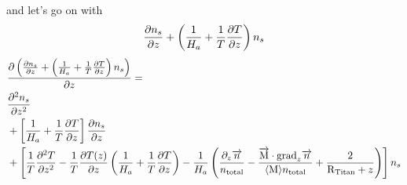 and let's go on with
\[
\frac{\partial n_s}{\partial z} + \left(\frac{1}{H_a} + \frac{1}{T}\frac{\partial T}{\partial z}\right)n_s
\]
\begin{equation}
\begin{split}
& \frac{\partial\left(\frac{\partial n_s}{\partial z} + \left(\frac{1}{H_a} + \frac{1}{T}\frac{\partial T}{\partial z}\right)n_s\right)}{\partial z} = \\
& \frac{\partial^2n_s}{\partial{z}^2} \\
& + \left[\frac{1}{H_a} + \frac{1}{T}\frac{\partial T}{\partial z}\right]\frac{\partial n_s}{\partial z} \\
& + \left[ \frac{1}{T}\frac{\partial^2T}{\partial{z}^2} 
          - \frac{1}{T}\frac{\partial T(z)}{\partial z}\left(\frac{1}{H_a}
                                           + \frac{1}{T}\frac{\partial T}{\partial z}
                                     \right)
           -\frac{1}{H_a}
                             \left(
                                  \frac{\partial_{z}{\overrightarrow{n}}}{n_\text{total}}
                                - \frac{\overrightarrow{\text{M}}\cdot\text{grad}_{z}\overrightarrow{n}}{\langle\text{M}\rangle n_\text{total}}
                                + \frac{2}{\text{R}_\text{Titan} + z} 
                            \right)
     \right]n_s \\
\end{split}
\label{Titan:diff_deriv_K_fac}
\end{equation}
